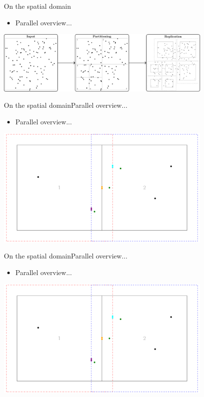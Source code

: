 \documentclass{beamer}
\begin{document}
     \begin{frame}{On the spatial domain}{}
        \begin{itemize} \item Parallel overview... \end{itemize} \vspace{0.5cm}

         \centering
         \includegraphics[width=0.8\textwidth]{figures/MF_stages/P123}
     \end{frame}

     \begin{frame}{On the spatial domain}{Parallel overview...}
        \begin{itemize} \item Parallel overview... \end{itemize} \vspace{0.5cm}

        \centering
        \includegraphics[page=1,width=0.8\textwidth]{figures/merge}
     \end{frame}

     \begin{frame}{On the spatial domain}{Parallel overview...}
        \begin{itemize} \item Parallel overview... \end{itemize} \vspace{0.5cm}

         \centering
         \includegraphics[page=2,width=0.8\textwidth]{figures/merge}
     \end{frame}
\end{document}
